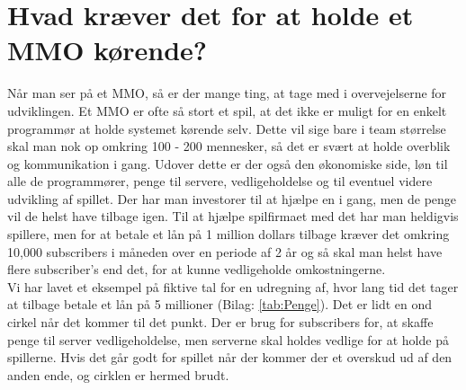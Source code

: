 \chapter{Hvad kræver det for at holde et MMO kørende?}
Når man ser på et MMO, så er der mange ting, at tage med i overvejelserne for udviklingen. Et MMO er ofte så stort et spil, at det ikke er muligt for en enkelt programmør at holde systemet kørende selv. Dette vil sige bare i team størrelse skal man nok op omkring 100 - 200 mennesker\cite{NOMMO}, så det er svært at holde overblik og kommunikation i gang. Udover dette er der også den økonomiske side, løn til alle de programmører, penge til servere, vedligeholdelse og til eventuel videre udvikling af spillet. Der har man investorer til at hjælpe en i gang, men de penge vil de helst have tilbage igen. Til at hjælpe spilfirmaet med det har man heldigvis spillere, men for at betale et lån på 1 million dollars tilbage kræver det  omkring 10,000 subscribers i måneden over en periode af 2 år\cite{Escapist} og så skal man helst have flere subscriber's end det, for at kunne vedligeholde omkostningerne.\\ 
Vi har lavet et eksempel på fiktive tal for en udregning af, hvor lang tid det tager at tilbage betale et lån på 5 millioner (Bilag: \ref{tab:Penge}). Det er lidt en ond cirkel når det kommer til det punkt. Der er brug for subscribers for, at skaffe penge til server vedligeholdelse, men serverne skal holdes vedlige for at holde på spillerne. Hvis det går godt for spillet når der kommer der et overskud  ud af den anden ende, og cirklen er hermed brudt.